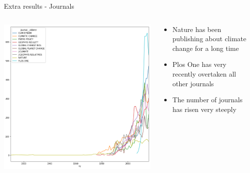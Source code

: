 \documentclass[9pt]{beamer}
\begin{document}
\begin{frame}{Extra results - Journals}

\begin{columns}
	\begin{column}{0.55\linewidth}
		\begin{center}
			\includegraphics[width=\linewidth]{../plots/journals/journal_papers.png}
		\end{center}
	\end{column}
	\begin{column}{0.45\linewidth}
		\begin{center}
			\begin{itemize}
				\item Nature has been publishing about climate change for a long time
				\item Plos One has very recently overtaken all other journals
				\item The number of journals has risen very steeply
			\end{itemize}

\end{center}
\end{column}
\end{columns}
\end{frame}
\end{document}
